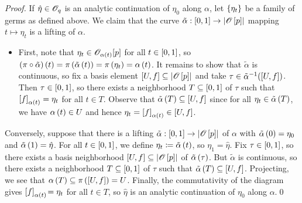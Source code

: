 \documentclass[../Moduli_Spaces_of_Riemann_Surfaces.tex]{subfiles}
\begin{document}
    \begin{proof}
        If $\hat{\eta}\in\mathscr{O}_q$ is an analytic continuation of $\eta_0$ along $\alpha$, let $\left\{\eta_t\right\}$ be a family of germs as defined above. We claim that the curve $\tilde{\alpha}:\left[0,1\right]\to\left|\mathscr{O}\left[p\right]\right|$ mapping $t\mapsto\eta_t$ is a lifting of $\alpha$.
        \begin{itemize}
            \item First, note that $\eta_t\in\mathscr{O}_{\alpha\left(t\right)}\!\left[p\right]$ for all $t\in\left[0,1\right]$, so $\left(\pi\circ\tilde{\alpha}\right)\left(t\right)=\pi\left(\tilde{\alpha}\left(t\right)\right)=\pi\left(\eta_t\right)=\alpha\left(t\right)$. It remains to show that $\tilde{\alpha}$ is continuous, so fix a basis element $\left[U,f\right]\subseteq\left|\mathscr{O}\left[p\right]\right|$ and take $\tau\in\tilde{\alpha}^{-1}\!\left(\left[U,f\right]\right)$. Then $\tau\in\left[0,1\right]$, so there exists a neighborhood $T\subseteq\left[0,1\right]$ of $\tau$ such that $\left[f\right]_{\alpha\left(t\right)}=\eta_t$ for all $t\in T$. Observe that $\tilde{\alpha}\left(T\right)\subseteq\left[U,f\right]$ since for all $\eta_t\in\tilde{\alpha}\left(T\right)$, we have $\alpha\left(t\right)\in U$ and hence $\eta_t=\left[f\right]_{\alpha\left(t\right)}\in\left[U,f\right]$.
        \end{itemize}
        Conversely, suppose that there is a lifting $\tilde{\alpha}:\left[0,1\right]\to\left|\mathscr{O}\left[p\right]\right|$ of $\alpha$ with $\tilde{\alpha}\left(0\right)=\eta_0$ and $\tilde{\alpha}\left(1\right)=\hat{\eta}$. For all $t\in\left[0,1\right]$, we define $\eta_t\coloneqq\tilde{\alpha}\left(t\right)$, so $\eta_1=\hat{\eta}$. Fix $\tau\in\left[0,1\right]$, so there exists a basis neighborhood $\left[U,f\right]\subseteq\left|\mathscr{O}\left[p\right]\right|$ of $\tilde{\alpha}\left(\tau\right)$. But $\tilde{\alpha}$ is continuous, so there exists a neighborhood $T\subseteq\left[0,1\right]$ of $\tau$ such that $\tilde{\alpha}\left(T\right)\subseteq\left[U,f\right]$. Projecting, we see that $\alpha\left(T\right)\subseteq\pi\left(\left[U,f\right]\right)=U$. Finally, the commutativity of the diagram gives $\left[f\right]_{\alpha\left(t\right)}\!=\eta_t$ for all $t\in T$, so $\hat{\eta}$ is an analytic continuation of $\eta_0$ along $\alpha$.\qed
    \end{proof}
\end{document}
